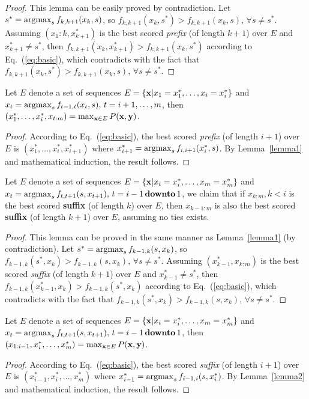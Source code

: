 \begin{proof}
This lemma can be easily proved by contradiction.
Let $s^* = \operatorname*{argmax}_{s} f_{k, k+1}(x_k, s)$, so $f_{k,k+1}(x_k, s^*) > f_{k,k+1}(x_k, s), \, \forall s \ne s^*$.
Assuming $(x_1:k, x_{k+1}^*)$ is the best scored \emph{prefix} (of length $k+1$) over $E$ and $x_{k+1}^* \ne s^*$,
then $f_{k,k+1}(x_k, x_{k+1}^*) > f_{k,k+1}(x_k, s^*)$ according to Eq.~(\ref{eq:basic}), 
which contradicts with the fact that $f_{k,k+1}(x_k, s^*) > f_{k,k+1}(x_k, s), \, \forall s \ne s^*$.
\end{proof}

\begin{theorem}
\label{theorem1}
Let $E$ denote a set of sequences $E = \{\mathbf{x} |x_1 = x_1^*, \dots, x_i = x_i^*\}$ and
$x_t = \operatorname*{argmax}_{s} f_{t-1, t}(x_t, s), \, t = i+1,\dots,m$, 
then $(x_1^*,\dots,x_i^*, x_{t:m}) = \max_{\mathbf{x} \in E} P(\mathbf{x},\mathbf{y})$.
\end{theorem}

\begin{proof}
According to Eq.~(\ref{eq:basic}), the best scored \emph{prefix} (of length $i+1$) over $E$ is $(x_1^*,\dots,x_i^*,x_{i+1}^*)$
where $x_{i+1}^* = \operatorname*{argmax}_{s} f_{i, i+1}(x_i^*, s)$.
By Lemma~\ref{lemma1} and mathematical induction, the result follows.
\end{proof}

\begin{lemma}
\label{lemma2}
Let $E$ denote a set of sequences $E = \{\mathbf{x} |x_i = x_i^*, \dots, x_m = x_m^*\}$ and
$x_t = \operatorname*{argmax}_{s} f_{t, t+1}(s, x_{t+1}), \, t = i-1 \,\textbf{downto}\, 1$, 
we claim that if $x_{k:m}, k < i$ is the best scored \textbf{suffix} (of length $k$) over $E$, 
then $x_{k-1:m}$ is also the best scored \textbf{suffix} (of length $k+1$) over $E$,
assuming no ties exists.
\end{lemma}

\begin{proof}
This lemma can be proved in the same manner as Lemma~\ref{lemma1} (by contradiction).
Let $s^* = \operatorname*{argmax}_{s} f_{k-1, k}(s, x_k)$, so $f_{k-1,k}(s^*, x_k) > f_{k-1,k}(s, x_k), \, \forall s \ne s^*$.
Assuming $(x_{k-1}^*, x_{k:m})$ is the best scored \emph{suffix} (of length $k+1$) over $E$ and $x_{k-1}^* \ne s^*$,
then $f_{k-1,k}(x_{k-1}^*, x_k) > f_{k-1,k}(s^*, x_k)$ according to Eq.~(\ref{eq:basic}), 
which contradicts with the fact that $f_{k-1,k}(s^*, x_k) > f_{k-1,k}(s, x_k), \, \forall s \ne s^*$.
\end{proof}

\begin{theorem}
\label{theorem2}
Let $E$ denote a set of sequences $E = \{\mathbf{x} |x_i = x_i^*, \dots, x_m = x_m^*\}$ and
$x_t = \operatorname*{argmax}_{s} f_{t, t+1}(s, x_{t+1}), \, t = i-1 \,\textbf{downto}\, 1$, 
then $(x_{1:i-1},x_i^*,\dots,x_m^*) = \max_{\mathbf{x} \in E} P(\mathbf{x},\mathbf{y})$.
\end{theorem}

\begin{proof}
According to Eq.~(\ref{eq:basic}), the best scored \emph{suffix} (of length $i+1$) over $E$ is $(x_{i-1}^*,x_i^*,\dots,x_m^*)$
where $x_{i-1}^* = \operatorname*{argmax}_{s} f_{i-1, i}(s, x_i^*)$.
By Lemma~\ref{lemma2} and mathematical induction, the result follows.
\end{proof}

